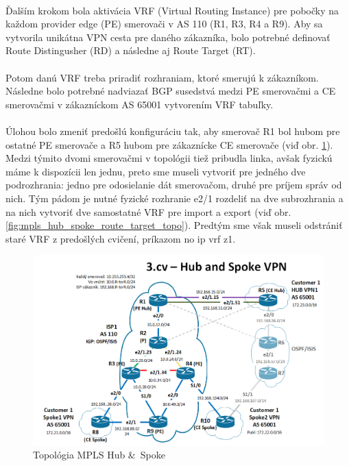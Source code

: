\documentclass[12pt,twoside,a4paper]{report}
\begin{document}
\paragraph{}
Ďalším krokom bola aktivácia VRF (Virtual Routing Instance) pre pobočky na každom provider edge (PE) smerovači v AS 110 (R1, R3, R4 a R9). Aby sa vytvorila unikátna VPN cesta pre daného zákazníka, bolo potrebné definovať Route Distingusher (RD) a následne aj Route Target (RT).

\paragraph{}
Potom danú VRF treba priradiť rozhraniam, ktoré smerujú k zákazníkom. Následne bolo potrebné nadviazať BGP susedstvá medzi PE smerovačmi a CE smerovačmi v zákazníckom AS 65001 vytvorením VRF tabuľky.

\paragraph{}
Úlohou bolo zmeniť predošlú konfiguráciu tak, aby smerovač R1 bol hubom pre ostatné PE smerovače a R5 hubom pre zákaznícke CE smerovače (viď obr. \ref{fig:mpls_hub_spoke_topo}). Medzi týmito dvomi smerovačmi v topológii tiež pribudla linka, avšak fyzickú máme k dispozícii len jednu, preto sme museli vytvoriť pre jedného dve podrozhrania: jedno pre odosielanie dát  smerovačom, druhé pre príjem správ od nich. Tým pádom je nutné fyzické rozhranie e2/1 rozdeliť na dve subrozhrania a na nich vytvoriť dve samostatné VRF pre import a export (viď obr. \ref{fig:mpls_hub_spoke_route_target_topo}). Predtým sme však museli odstrániť staré VRF z predošlých cvičení, príkazom no ip vrf z1.

\begin{figure}[!htbp]
\centering
\includegraphics[width=14cm,keepaspectratio]{mpls_hub_spoke_topo}
\caption{Topológia MPLS Hub \& Spoke}
\label{fig:mpls_hub_spoke_topo}
\end{figure}
\end{document}
